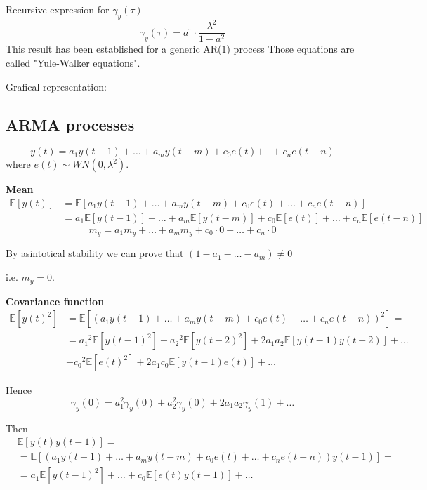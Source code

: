 Recursive expression for $\gamma_{y}(\tau)$
$$
\gamma_{y}(\tau)=a^{\tau} \cdot \frac{\lambda^{2}}{1-a^{2}}
$$
This result has been established for a generic AR($1$) process
Those equations are called "Yule-Walker equations".

Grafical representation:



\subsection{ARMA processes}
$$
y(t)=a_{1} y(t-1)+\ldots+a_{m} y(t-m)+c_{0} e(t)+_{\ldots}+c_{n} e(t-n)
$$
where $e(t) \sim W N\left(0, \lambda^{2}\right)$.

\textbf{Mean}
\begin{align*}
	\mathbb{E}[y(t)] &=\mathbb{E}\left[a_{1} y(t-1)+\ldots+a_{m} y(t-m)+c_{0} e(t)+\ldots+c_{n} e(t-n)\right] \\
	&=a_{1} \mathbb{E}[y(t-1)]+\ldots+a_{m} \mathbb{E}[y(t-m)]+c_{0} \mathbb{E}[e(t)]+\ldots+c_{n} \mathbb{E}[e(t-n)]
\end{align*}
$$
m_{y}=a_{1} m_{y}+\ldots+a_{m} m_{y}+c_{0} \cdot 0+\ldots+c_{n} \cdot 0
$$

By asintotical stability we can prove that $(1-a_1-\ldots-a_m)\neq0$

i.e. $m_{y}=0$.

\textbf{Covariance function}
\begin{align*}
	\mathbb{E}\left[y(t)^{2}\right]&=\mathbb{E}\left[\left(a_{1} y(t-1)+\ldots+a_{m} y(t-m)+c_{0} e(t)+\ldots+c_{n} e(t-n)\right)^{2}\right]=\\
	&= a_{1}{ }^{2} \mathbb{E}\left[y(t-1)^{2}\right]+a_{2}{ }^{2} \mathbb{E}\left[y(t-2)^{2}\right]+2 a_{1} a_{2} \mathbb{E}[y(t-1) y(t-2)]+\ldots \\
	&+c_{0}{ }^{2} \mathbb{E}\left[e(t)^{2}\right]+2 a_{1} c_{0} \mathbb{E}[y(t-1) e(t)]+\ldots
\end{align*}

Hence
$$
\gamma_{y}(0)=a_{1}^{2} \gamma_{y}(0)+a_{2}^{2} \gamma_{y}(0)+2 a_{1} a_{2} \gamma_{y}(1)+\ldots
$$

Then
\begin{align*}
	&\mathbb{E}[y(t) y(t-1)]= \\
	&=\mathbb{E}\left[\left(a_{1} y(t-1)+\ldots+a_{m} y(t-m)+c_{0} e(t)+\ldots+c_{n} e(t-n)\right) y(t-1)\right]= \\
	&=a_{1} \mathbb{E}\left[y(t-1)^{2}\right]+\ldots+c_{0} \mathbb{E}[e(t) y(t-1)]+\ldots
\end{align*}

